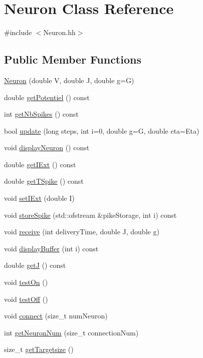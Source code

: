 \hypertarget{classNeuron}{\section{Neuron Class Reference}
\label{classNeuron}
}


{\ttfamily \#include $<$Neuron.\-hh$>$}

\subsection*{Public Member Functions}
\begin{DoxyCompactItemize}
\item 
\hyperlink{classNeuron_a3248dc4eb8ab1d19f8b8493c3491dbf5}{Neuron} (double V, double J, double g=G)
\item 
double \hyperlink{classNeuron_ac1eee18fc2e8bb6b5f39f727443e6930}{get\-Potentiel} () const 
\item 
int \hyperlink{classNeuron_ab1efa405eb0cd7bac6ca012c961efe5d}{get\-Nb\-Spikes} () const 
\item 
bool \hyperlink{classNeuron_afb9cc7341f936c0db49ccf230c64b769}{update} (long steps, int i=0, double g=G, double eta=Eta)
\item 
void \hyperlink{classNeuron_a3953cbc7a936c974bb93a1507dc107a3}{display\-Neuron} () const 
\item 
double \hyperlink{classNeuron_a3c05aa14cfa57146a609cf59d6729a28}{get\-I\-Ext} () const 
\item 
double \hyperlink{classNeuron_a55f54b1fde03380d1961df168681b40f}{get\-T\-Spike} () const 
\item 
void \hyperlink{classNeuron_afedfd126ca5fb3c3371f0c81521110c1}{set\-I\-Ext} (double I)
\item 
void \hyperlink{classNeuron_a242fda806f234c192576c34907140c27}{store\-Spike} (std\-::ofstream \&pike\-Storage, int i) const 
\item 
void \hyperlink{classNeuron_ae6b512fa5e66521fc5455d037b8575df}{receive} (int delivery\-Time, double J, double g)
\item 
void \hyperlink{classNeuron_a0782ae55ba365478ecb4844a85d1f7fc}{display\-Buffer} (int i) const 
\item 
double \hyperlink{classNeuron_a320ab48e220523371b266385c650e31f}{get\-J} () const 
\item 
void \hyperlink{classNeuron_a2f26d1bc3d172c2e5319541dc64d1979}{test\-On} ()
\item 
void \hyperlink{classNeuron_a4063d72fda40dd39153fc871435b9d6a}{test\-Off} ()
\item 
void \hyperlink{classNeuron_a894c1589ac89df363631f03c5999236a}{connect} (size\-\_\-t num\-Neuron)
\item 
int \hyperlink{classNeuron_a044cf97c24a6f465e855df50ef13d89e}{get\-Neuron\-Num} (size\-\_\-t connection\-Num)
\item 
size\-\_\-t \hyperlink{classNeuron_af519d734d92414ae4af2b1c205c896ae}{get\-Targetsize} ()
\end{DoxyCompactItemize}


